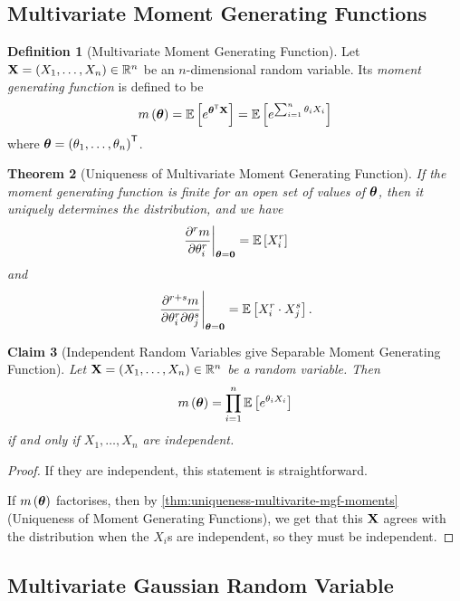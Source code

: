 \documentclass{article}
\newtheorem{theorem}{Theorem}[section]
\newtheorem{claim}[theorem]{Claim}
\theoremstyle{definition}
\newtheorem{definition}[theorem]{Definition}
\theoremstyle{remark}
\newcommand{\RR}{\mathbb{R}}
\newcommand{\Expt}{\mathbb{E}}
\newcommand{\transpose}{^{\mathsf{T}}}
\newcommand{\rightbar}[1]{\left.#1\right|}
\begin{document}
\subsection{Multivariate Moment Generating Functions}

\begin{definition}[Multivariate Moment Generating Function]
    \label{def:multivariate-mgf}%
    Let \(\vb{X} = \pqty{X_1, \ldots, X_n} \in \RR^n\) be an \(n\)-dimensional random variable. Its \emph{moment generating function} is defined to be
    \[
        m\pqty{\vb*{\theta}} = \Expt\bqty{e^{\vb*{\theta}\transpose \vb{X}}} = \Expt\bqty{e^{\sum_{i = 1}^{n} \theta_i X_i}}
    \]
    where \(\vb*{\theta} = \pqty{\theta_1, \ldots, \theta_n} \transpose\).
\end{definition}

\begin{theorem}[Uniqueness of Multivariate Moment Generating Function]
    \label{thm:uniqueness-multivarite-mgf-moments}%
    If the moment generating function is finite for an open set of values of \(\vb*{\theta}\), then it uniquely determines the distribution, and we have
    \[
        \rightbar{\pdv[r]{m}{\theta_i}}_{\vb*{\theta} = \vb{0}} = \Expt\bqty{X_i^r}
    \]
    and
    \[
        \rightbar{\frac{\partial^{r + s} m}{\partial \theta_i^r \partial \theta_j^s}}_{\vb*{\theta} = \vb{0}} = \Expt\bqty{X_i^r \cdot X_j^s}.
    \]
\end{theorem}

\begin{claim}[Independent Random Variables give Separable Moment Generating Function]
    \label{claim:independent-rv-separable-mgf}%
    Let \(\vb{X} = \pqty{X_1, \ldots, X_n} \in \RR^n\) be a random variable. Then
    \[
        m\pqty{\vb*{\theta}} = \prod_{i = 1}^{n} \Expt\bqty{e^{\theta_i X_i}}
    \]
    if and only if \(X_1, \ldots, X_n\) are independent.
\end{claim}

\begin{proof}
    If they are independent, this statement is straightforward.

    If \(m\pqty{\vb*{\theta}}\) factorises, then by \autoref{thm:uniqueness-multivarite-mgf-moments} (Uniqueness of Moment Generating Functions), we get that this \(\vb{X}\) agrees with the distribution when the \(X_i\)s are independent, so they must be independent.
\end{proof}

\subsection{Multivariate Gaussian Random Variable}
\end{document}
